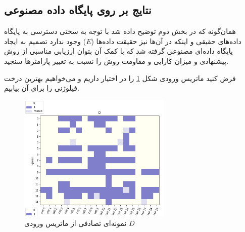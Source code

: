 \subsection{نتایج بر روی پایگاه داده مصنوعی}
همان‌گونه که در بخش دوم توضیح داده شد با توجه به سختی دسترسی به پایگاه داده‌های حقیقی و اینکه در آن‌ها نیز حقیقت داده‌ها ($E$) وجود ندارد تصمیم به ایجاد پایگاه داده‌ای مصنوعی گرفته شد که با کمک آن بتوان ارزیابی مناسبی از روش پیشنهادی و میزان کارایی و مقاومت روش را نسبت به تغییر پارامترها سنجید.

فرض کنید ماتریس ورودی شکل \ref{fig:sy_D1} را در اختیار داریم و می‌خواهیم بهترین درخت فیلوژنی را برای آن بیابیم.
\begin{figure}[!ht]
	\centering
	\includegraphics[width=0.65\textwidth]{img/chaps/er/s_input_D}
	\caption{نمونه‌ای تصادفی از ماتریس ورودی $D$}
	\label{fig:sy_D1}
\end{figure}

